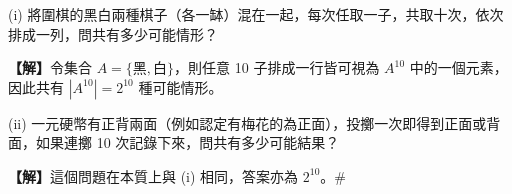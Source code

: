 \vspace{1em}
\begin{example}\label{ex:b5s-2-8}
(i) 將圍棋的黑白兩種棋子（各一缽）混在一起，每次任取一子，共取十次，依次排成一列，問共有多少可能情形？
\par\smallskip\noindent\textbf{【解】}\quad 令集合 $A = \{\text{黑}, \text{白}\}$，則任意 10 子排成一行皆可視為 $A^{10}$ 中的一個元素，因此共有 $|A^{10}| = 2^{10}$ 種可能情形。

\indent(ii) 一元硬幣有正背兩面（例如認定有梅花的為正面），投擲一次即得到正面或背面，如果連擲 10 次記錄下來，問共有多少可能結果？
\par\smallskip\noindent\textbf{【解】}\quad 這個問題在本質上與 (i) 相同，答案亦為 $2^{10}$。\hfill\#
\end{example}

\vspace{1em}
